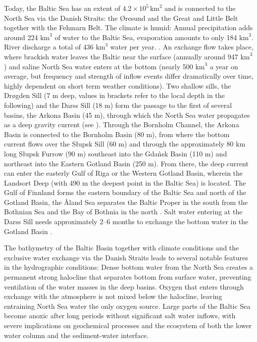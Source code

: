 Today, the Baltic Sea has an extent of $4.2 \times 10^{5} \, \text{km}^2$ 
\citep[][]{balticsea} and is connected to the North Sea via the Danish Straits: 
the \O resund and the Great and Little Belt together with the Fehmarn Belt. The 
climate is humid: Annual precipitation adds around 224 $\text{km}^3$ of water to 
the Baltic Sea, evaporation amounts to only 184 $\text{km}^3$. River discharge a 
total of 436 $\text{km}^3$ water per year. \citep[][]{reissmann2009}. An 
exchange flow takes place, where brackish water leaves the Baltic near the 
surface (annually around 947 $\text{km}^3$) and saline North Sea water enters at 
the bottom (nearly 500 $\text{km}^3$ a year on average, but frequency and 
strength of inflow events differ dramatically over time, highly dependent on 
short term weather conditions). Two shallow sills, the Dr\o gden Sill (7 m deep, 
values in brackets refer to the local depth in the following) and the Darss Sill 
(18 m) form the passage to the first of several basins, the Arkona Basin (45 m), 
through which the North Sea water propagates as a deep gravity current 
(see ). Through 
the Bornholm Channel, the Arkona Basin is connected to the Bornholm Basin (80 
m), from where the bottom current flows over the S\l upsk Sill (60 m) and 
through the approximately 80 km long S\l upsk Furrow (90 m) southeast into the 
Gda\`{n}sk Basin (110 m) and northeast into the Eastern Gotland Basin (250 m). 
From there, the deep current can enter the easterly Gulf of Riga or the Western 
Gotland Basin, wherein the Landsort Deep (with 490 m the deepest point in the 
Baltic Sea) is located. The Gulf of Finnland forms the eastern boundary of the 
Baltic Sea and north of the Gotland Basin, the \r{A}land Sea separates the 
Baltic Proper in the south from the Bothnian Sea and the Bay of Bothnia in the 
north \citep[][]{reissmann2009}. Salt water entering at the Darss Sill needs 
approximately 2--6 months to exchange the bottom water in the Gotland Basin 
\citep[][]{balticsea}.

The bathymetry of the Baltic Basin together with climate conditions and the 
exclusive water exchange via the Danish Straits leads to several notable 
features in the hydrographic conditions: Dense bottom water from the North Sea 
creates a permanent strong halocline that separates bottom from surface water, 
preventing ventilation of the water masses in the deep basins. Oxygen that 
enters through exchange with the atmosphere is not mixed below the halocline, 
leaving entraining North Sea water the only oxygen source. Large parts of the 
Baltic Sea become anoxic after long periods without significant salt water 
inflows, with severe implications on geochemical processes and the ecosystem of 
both the lower water column and the sediment-water interface. 

